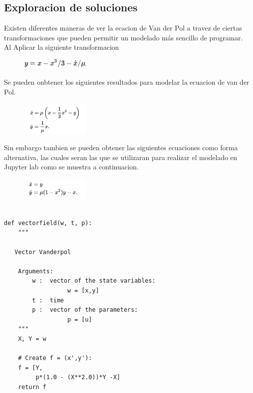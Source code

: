 \documentclass[a4paper]{article}
\begin{document}
\subsection{Exploracion de soluciones}

Existen diferentes maneras de ver la ecacion de Van der Pol a travez de ciertas transformaciones que pueden permitir un modelado más sencillo de programar. Al Aplicar la siguiente transformacion

 \begin{figure}[ht!]
\centering
\includegraphics[width=0.3\textwidth]{T1.png}
\end{figure}

Se pueden onbtener los siguientes resultados para modelar la ecuacion de van der Pol. 

\begin{figure}[ht!]
\centering
\includegraphics[width=0.3\textwidth]{Eq1.png}
\end{figure}

Sin embargo tambien se pueden obtener las siguientes ecuaciones como forma alternativa, las cuales seran las que se utilizaran para realizar el modelado en Jupyter lab como se muestra a continuacion.


\begin{figure}[ht!]
\centering
\includegraphics[width=0.3\textwidth]{Eq2.png}
\end{figure}

\begin{verbatim}

def vectorfield(w, t, p):
    """
   
   Vector Vanderpol
   
    Arguments:
        w :  vector of the state variables:
                  w = [x,y]
        t :  time
        p :  vector of the parameters:
                  p = [u]
    """
    X, Y = w

    # Create f = (x',y'):
    f = [Y,
         p*(1.0 - (X**2.0))*Y -X]
    return f

\end{verbatim}
\end{document}

